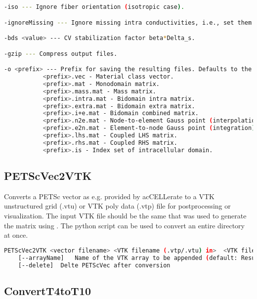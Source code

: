 \begin{lstlisting}[language=bash,caption=Runtime options for BidomainMatrixGenerator]
-iso --- Ignore fiber orientation (isotropic case).

-ignoreMissing --- Ignore missing intra conductivities, i.e., set them to 0. Only recommended to use with -bi.

-bds <value> --- CV stabilization factor beta*Delta_s.

-gzip --- Compress output files.

-o <prefix> --- Prefix for saving the resulting files. Defaults to the name of the input geometry sans extension. Depending on the given options, the following files may be created:
           <prefix>.vec - Material class vector.
           <prefix>.mat - Monodomain matrix.
           <prefix>.mass.mat - Mass matrix.
           <prefix>.intra.mat - Bidomain intra matrix.
           <prefix>.extra.mat - Bidomain extra matrix.
           <prefix>.i+e.mat - Bidomain combined matrix.
           <prefix>.n2e.mat - Node-to-element Gauss point (interpolation) matrix.
           <prefix>.e2n.mat - Element-to-node Gauss point (integration) matrix.
           <prefix>.lhs.mat - Coupled LHS matrix.
           <prefix>.rhs.mat - Coupled RHS matrix.
           <prefix>.is - Index set of intracellular domain.
\end{lstlisting}

\subsection{PETScVec2VTK}
\label{tools:PETScVec2VTK}

Converts a PETSc vector as e.g. provided by acCELLerate to a VTK unstructured grid (.vtu) or VTK poly data (.vtp) file for postprocessing or visualization. 
The input VTK file should be the same that was used to generate the matrix using .
The python script  can be used to convert an entire directory at once.
\begin{lstlisting}[language=bash,caption=Syntax for PETScVec2VTK]
PETScVec2VTK <vector filename> <VTK filename (.vtp/.vtu) in>  <VTK filename (.vtp/.vtu) out>
	[--arrayName]	Name of the VTK array to be appended (default: Results)
	[--delete]	Delte PETScVec after conversion
\end{lstlisting}

\subsection{ConvertT4toT10}
\label{tools:ConvertT4toT10}

